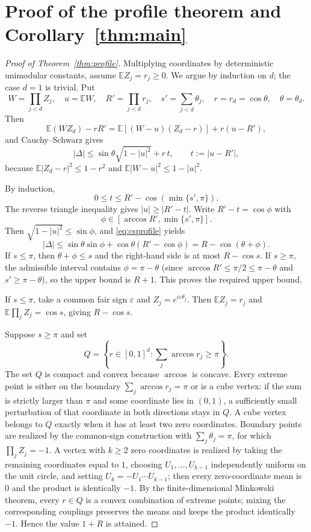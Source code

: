 \documentclass[11pt]{article}
\theoremstyle{definition}\newtheorem{definition}[theorem]{Definition}
\theoremstyle{remark}\newtheorem{remark}[theorem]{Remark}
\begin{document}
\section{Proof of the profile theorem and Corollary~\ref{thm:main}}
\begin{proof}[Proof of Theorem~\ref{thm:profile}]
Multiplying coordinates by deterministic unimodular constants, assume $\mathbb EZ_j=r_j\ge0$. We argue by induction on
$d$; the case $d=1$ is trivial. Put
\[
W=\prod_{j<d}Z_j,\quad u=\mathbb EW,\quad R'=\prod_{j<d}r_j,\quad
s'=\sum_{j<d}\theta_j,\quad r=r_d=\cos\theta,\quad \theta=\theta_d.
\]
Then
\[
\mathbb E(WZ_d)-rR'=\mathbb E[(W-u)(Z_d-r)]+r(u-R'),
\]
and Cauchy--Schwarz gives
\begin{equation}\label{eq:csprofile}
|\Delta|\le \sin\theta\sqrt{1-|u|^2}+r\,t,\qquad t:=|u-R'|,
\end{equation}
because $\mathbb E|Z_d-r|^2\le1-r^2$ and $\mathbb E|W-u|^2\le1-|u|^2$.

By induction,
\[
0\le t\le R'-\cos(\min\{s',\pi\}).
\]
The reverse triangle inequality gives $|u|\ge|R'-t|$. Write
$R'-t=\cos\phi$ with
\[
\phi\in[\arccos R',\min\{s',\pi\}].
\]
Then $\sqrt{1-|u|^2}\le\sin\phi$, and \eqref{eq:csprofile} yields
\[
|\Delta|\le \sin\theta\sin\phi+\cos\theta(R'-\cos\phi)
=R-\cos(\theta+\phi).
\]
If $s\le\pi$, then $\theta+\phi\le s$ and the right-hand side is at most $R-\cos s$. If $s\ge\pi$, the admissible
interval contains $\phi=\pi-\theta$ (since $\arccos R'\le\pi/2\le\pi-\theta$ and $s'\ge\pi-\theta$), so the upper bound is
$R+1$. This proves the required upper bound.

If $s\le\pi$, take a common fair sign $\varepsilon$ and $Z_j=e^{i\varepsilon\theta_j}$. Then
$\mathbb EZ_j=r_j$ and $\mathbb E\prod_jZ_j=\cos s$, giving $R-\cos s$.

Suppose $s\ge\pi$ and set
\[
Q=\left\{r\in[0,1]^d:\sum_j\arccos r_j\ge\pi\right\}.
\]
The set $Q$ is compact and convex because $\arccos$ is concave. Every extreme point is either on the boundary
$\sum_j\arccos r_j=\pi$ or is a cube vertex: if the sum is strictly larger than $\pi$ and some coordinate lies in
$(0,1)$, a sufficiently small perturbation of that coordinate in both directions stays in $Q$. A cube vertex belongs to
$Q$ exactly when it has at least two zero coordinates. Boundary points are realized by the common-sign construction
with $\sum_j\theta_j=\pi$, for which $\prod_jZ_j=-1$. A vertex with $k\ge2$ zero coordinates is realized by taking the
remaining coordinates equal to $1$, choosing $U_1,\ldots,U_{k-1}$ independently uniform on the unit circle, and setting
$U_k=-\overline{U_1\cdots U_{k-1}}$; then every zero-coordinate mean is $0$ and the product is identically $-1$.
By the finite-dimensional Minkowski theorem, every $r\in Q$ is a convex combination of extreme points; mixing the
corresponding couplings preserves the means and keeps the product identically $-1$. Hence the value $1+R$ is attained.
\end{proof}
\end{document}
